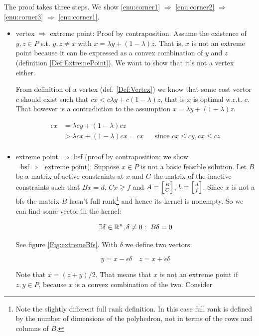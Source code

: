 \begin{pr} The proof takes three steps. We show \ref{enu:corner1} $\Rightarrow$ \ref{enu:corner2} $\Rightarrow$ \ref{enu:corner3} $\Rightarrow$ \ref{enu:corner1}.
\begin{itemize}
\item vertex $\Rightarrow$ extreme point: Proof by contraposition. Assume the existence of $y,z \in P$ s.t. $y,z\neq x$ with $x= \lambda y + (1-\lambda )z$. That is, $x$ is not an extreme point because it can be expressed as a convex combination of $y$ and $z$ (definition \ref{Def:ExtremePoint}). We want to show that it's not a vertex either.

From definition of a vertex (def. \ref{Def:Vertex}) we know that some cost vector $c$ should exist such that $c x < c \lambda y  + c (1-\lambda) z$, that is $x$ is optimal w.r.t. $c$. That however is a contradiction to the assumption $x= \lambda y + (1-\lambda )z$.

\begin{align*}
cx &= \lambda cy +(1-\lambda)cz\\
   &> \lambda cx + (1-\lambda)cx = cx && \text{since }cx\leq cy, cx\leq cz\\
\end{align*}

\item extreme point $\Rightarrow$ bsf (proof by contraposition; we show $\neg \text{bsf} \Rightarrow \neg \text{extreme point}$): Suppose $x\in P$ is not a basic feasible solution. Let $B$ be a matrix of active constraints at $x$ and $C$ the matrix of the inactive constraints such that $Bx=d$, $Cx\gneq f$ and $A = \left[B\atop C\right]$, $b=\left[d\atop f\right]$. Since $x$ is not a bfs the matrix $B$ hasn't full rank\footnote{Note the slightly different full rank definition. In this case full rank is defined by the number of dimensions of the polyhedron, not in terms of the rows and columns of $B$.} and hence its kernel is nonempty. So we can find some vector in the kernel:

\[\exists \delta \in \R^n, \delta \neq 0:\ B\delta =0\]

See figure \ref{Fig:extremeBfs}. With $\delta$ we define two vectors:

\[y=x-\epsilon \delta \quad z = x+\epsilon \delta\]

Note that $x=(z+y)/2$. That means that $x$ is not an extreme point if $z,y \in P$, because $x$ is a convex combination of the two. Consider 


\end{itemize}
\end{pr}
